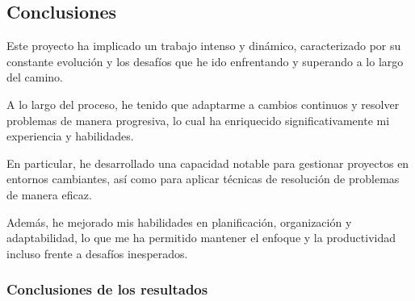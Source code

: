 
\subsection{Conclusiones}


Este proyecto ha implicado un trabajo intenso y dinámico, caracterizado por su constante evolución y los desafíos que he ido enfrentando y superando a lo largo del camino. 

A lo largo del proceso, he tenido que adaptarme a cambios continuos y resolver problemas de manera progresiva, lo cual ha enriquecido significativamente mi experiencia y habilidades.

En particular, he desarrollado una capacidad notable para gestionar proyectos en entornos cambiantes, así como para aplicar técnicas de resolución de problemas de manera eficaz. 

Además, he mejorado mis habilidades en planificación, organización y adaptabilidad, lo que me ha permitido mantener el enfoque y la productividad incluso frente a desafíos inesperados.



\subsubsection{Conclusiones de los resultados}


